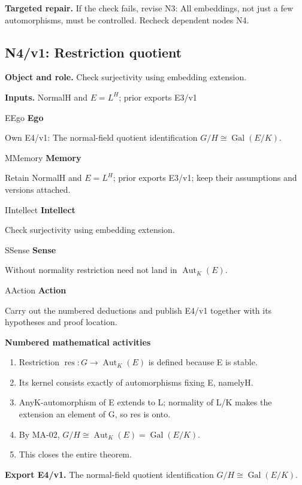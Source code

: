 \documentclass[preprint,12pt,aps,pra,showkeys,amsmath,amssymb,superscriptaddress,floatfix]{revtex4-2}
\theoremstyle{definition}
\theoremstyle{remark}
\newcommand{\mmfaculty}[3]{%
 \begin{mmfacultybox}{#1}{#2}
 {\sffamily\bfseries\color{MMBlue}#2}\par\smallskip #3
 \end{mmfacultybox}}
\newcommand{\field}[2]{\par\smallskip\noindent\textbf{#1.} #2\par}
\begin{document}
\field{Targeted repair}{If the check fails, revise N3: All embeddings, not just a few
automorphisms, must be controlled. Recheck dependent nodes N4.}

\clearpage

\subsection{N4/v1: Restriction quotient}

\field{Object and role}{Check surjectivity using embedding extension.}

\field{Inputs}{NormalH and \(E=L^H\); prior exports E3/v1}

\mmfaculty{E}{Ego}{Own E4/v1: The normal-field quotient identification
\(G/H\cong \operatorname{Gal} (E/K)\).}

\mmfaculty{M}{Memory}{Retain NormalH and \(E=L^H\); prior exports E3/v1; keep their
assumptions and versions attached.}

\mmfaculty{I}{Intellect}{Check surjectivity using embedding extension.}

\mmfaculty{S}{Sense}{Without normality restriction need not land in
\(\operatorname{Aut} _K(E)\).}

\mmfaculty{A}{Action}{Carry out the numbered deductions and publish E4/v1 together with its
hypotheses and proof location.}

\smallskip\noindent\textbf{Numbered mathematical activities}

\begin{enumerate}[label=N4.\arabic*,leftmargin=3.4em]

\item Restriction \(\operatorname{res} :G\to \operatorname{Aut} _K(E)\) is
defined because E is stable.

\item Its kernel consists exactly of automorphisms fixing E, namelyH.

\item AnyK-automorphism of E extends to L; normality of L/K makes the
extension an element of G, so res is onto.

\item By MA-02,
\(G/H\cong \operatorname{Aut} _K(E)=\operatorname{Gal} (E/K)\).

\item This closes the entire theorem.

\end{enumerate}

\field{Export E4/v1}{The normal-field quotient identification
\(G/H\cong \operatorname{Gal} (E/K)\).}
\end{document}
